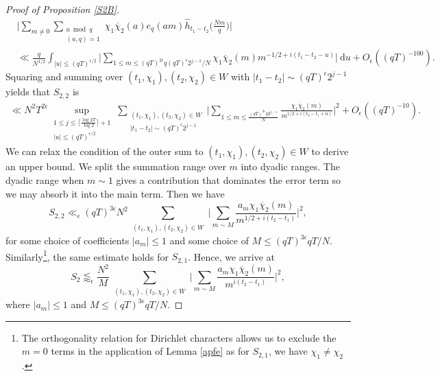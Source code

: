 \documentclass[12pt]{amsart}
\theoremstyle{definition}
\theoremstyle{plain}
\theoremstyle{remark}
\numberwithin{equation}{section}
\numberwithin{theorem}{section}
\numberwithin{equation}{section}
\begin{document}
\begin{proof}[Proof of Proposition \ref{S2B}]
		\begin{align*}
			&\bigg|\sum_{m\neq 0}\sum_{\substack{a \bmod q \\ (a, q)=1}}\chi_{1}
			\overline{\chi}_{2}(a)
			e_q(am)
			\hat{h}_{t_{1}-t_{2}}\bigg(\frac{Nm}{q}\bigg)\bigg|
			\\
			&\ll \frac{q}{N^{1/2}}\int_{|u|\leq (qT)^{\epsilon/2}}\bigg|\sum_{1\leq m \leq (qT)^{2\epsilon}q(qT)^{\epsilon}2^{j-1}/N}\chi_{1}
			\overline{\chi}_{2}(m)m^{-1/2+i(t_{1}-t_{2}-u)}\bigg|\:\mathrm{d}u +O_{\epsilon}((qT)^{-100}).
		\end{align*}
		Squaring and summing over $(t_{1}, \chi_{1}), (t_{2}, \chi_{2})\in W$ with $|t_{1}-t_{2}|\sim (qT)^{\epsilon}2^{j-1}$ yields that $S_{2,2}$ is
		\begin{align*}
			\ll N^{2}T^{2\epsilon}\sup_{\substack{1\leq j \leq \lceil\frac{\log 2T}{\log 2}\rceil+1 \\ |u|\leq(qT)^{\epsilon/2} }}\sum_{\substack{(t_1,\chi_1), (t_2,\chi_2) \in W \\|t_{1}-t_{2}|\sim (qT)^{\epsilon}2^{j-1}}}\bigg|\sum_{1\leq m \leq \frac{(qT)^{3\epsilon}q2^{j-1}}{N}}\frac{\chi_{1}
				\overline{\chi}_{2}(m)}{m^{1/2+i(t_{2}-t_{1}+u)}}\bigg|^{2}+O_{\epsilon}((qT)^{-10}).
		\end{align*}
		We can relax the condition of the outer sum to $(t_1,\chi_1),(t_2,\chi_2)\in W$ to derive an upper bound. We split the summation range over $m$ into dyadic ranges. The dyadic range when $m \sim 1$ gives a contribution that dominates the error term so we may absorb it into the main term. Then we have
		\[S_{2,2} \ll_{\epsilon} (qT)^{3\epsilon}N^{2}\sum_{\substack{(t_1,\chi_1),(t_2,\chi_2)\in W}}\bigg|\sum_{ m\sim M}\frac{a_{m}\chi_{1}
			\overline{\chi}_{2}(m)}{m^{1/2+i(t_{2}-t_{1})}}\bigg|^{2},\]
		for some choice of coefficients $|a_m| \leq 1$ and some choice of $M\leq (qT)^{3\epsilon}qT/N$.
		Similarly\footnote{The orthogonality relation for Dirichlet characters allows us to exclude the $m=0$ terms in the application of Lemma \ref{apfe} as for $S_{2,1}$, we have $\chi_1 \neq \chi_2$.}, the same estimate holds for $S_{2,1}$. Hence, we arrive at
		\begin{equation}\label{S2B1}
			S_{2}\lessapprox_{\epsilon} \frac{N^{2}}{M}\sum_{\substack{(t_1,\chi_1), (t_2,\chi_2) \in W}}\bigg|\sum_{ m\sim M}\frac{a_{m}\chi_{1}
				\overline{\chi}_{2}(m)}{m^{i(t_{2}-t_{1})}}\bigg|^{2},
		\end{equation}
		where $|a_{m}|\leq 1$ and $M\leq (qT)^{3\epsilon}qT/N$.
		

\end{proof}
\end{document}
